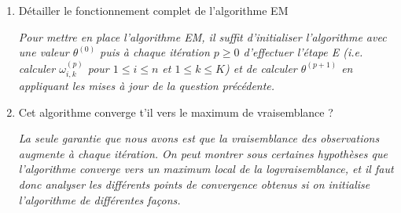 \documentclass[a4paper,10pt,fleqn]{article}
\newcommand{\1}{\ensuremath{\mathbbm{1}}}
\begin{document}
\begin{enumerate}
\begin{enumerate}
\vspace{.2cm}

{\em Il est ais\'e de montrer que la fonction $\theta \mapsto Q(\theta;\theta^{(p)}) $ admet un maximum unique, obtenu en r\'esolvant l'\'equation $\nabla_\theta Q(\theta;\theta^{(p)}) = 0$. Pour tout $1\leq k \leq K$,
$$
\partial_{\lambda_k}Q(\theta;\theta^{(p)}) = \sum_{i=1}^n\omega_{i,k}^{(p)}(X_i) \left\{ - 1+ \frac{X_i}{\lambda_k}\right\}\,.
$$
On en d\'eduit que
$$
\lambda^{(p+1)}_k = \frac{\sum_{i=1}^n\omega_{i,k}^{(p)}(X_i)X_i}{\sum_{i=1}^n\omega_{i,k}^{(p)}(X_i)}\,.
$$
Par ailleurs, pour tout $1\leq k \leq K-1$, en utilisant que $\pi_K = 1 - \sum_{j=1}^{K-1}\pi_j$,
$$
\partial_{\pi_k}Q(\theta;\theta^{(p)}) = \sum_{i=1}^n \left\{\frac{\omega_{i,k}^{(p)}(X_i)}{\pi_k} - \frac{\omega_{i,k}^{(p)}(X_i)}{\pi_K}\right\}
$$
et on en d\'eduit que $k\mapsto\sum_{i=1}^n\omega_{i,k}^{(p)}(X_i)/\pi_k$ est constante. En utilisant par ailleurs que  $\sum_{k=1}^{K}\pi_k = 1$ et $\sum_{k=1}^{K}\omega_{i,k}^{(p)}(X_i)= 1$, on a
$$
\pi_k^{(p+1)} = \frac{1}{n}\sum_{i=1}^n\omega_{i,k}^{(p)}(X_i)\,.
$$} 
\item D\'etailler le fonctionnement complet de l'algorithme EM

\vspace{.2cm}

{\em Pour mettre en place l'algorithme EM, il suffit d'initialiser l'algorithme avec une valeur $\theta^{(0)}$ puis \`a chaque it\'eration $p\geq 0$ d'effectuer l'\'etape E (i.e. calculer $\omega_{i,k}^{(p)}$ pour $1\leq i \leq n$ et $1\leq k \leq K$) et de calculer $\theta^{(p+1)}$ en appliquant les mises \`a jour de la question pr\'ec\'edente.}
\item Cet algorithme converge t'il vers le maximum de vraisemblance ?

\vspace{.2cm}

{\em La seule garantie que nous avons est que la vraisemblance des observations augmente \`a chaque it\'eration. On peut montrer sous certaines hypoth\`eses que  l'algorithme converge vers un maximum local de la logvraisemblance, et il faut donc analyser les diff\'erents points de convergence obtenus si on initialise l'algorithme de diff\'erentes fa\c cons. }
\end{enumerate}
\end{enumerate}
\end{document}
